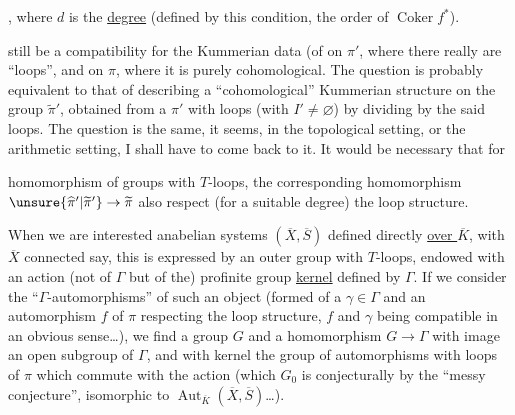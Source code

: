 

,
where $d$ is the \uline{degree} (defined  
by this condition,
   the order of $\operatorname{Coker}f^{*}$). 

 
still be a compatibility
for the Kummerian data (of
 on $\pi'$, where there really are
``loops'', and on $\pi$, where it is
purely cohomological. \unsure{\S} The question
is probably equivalent to that of describing
a ``cohomological'' Kummerian structure
on the group $\widetilde\pi'$, obtained from a $\pi'$ with
loops (with $I'\ne\varnothing$) by dividing by
the said loops. The question is the
same, it seems, in the topological setting,
or the arithmetic setting, I shall have to
come back to it. It would be necessary that for 



homomorphism  of groups with $T$-loops, the corresponding homomorphism
$\unsure{\widehat\pi'|\widetilde\pi'}\to\widetilde\pi$ also respect (for
a suitable degree) the loop structure.

When we are interested  anabelian systems
$(\overline X,\overline S)$ defined directly \uline{over $\overline K$}, with $\overline X$
connected say, this is expressed
by an outer group with $T$-loops,
endowed with an action (not of $\Gamma$ but
of the) profinite group \uline{kernel} defined by $\Gamma$.
If we consider the  ``$\Gamma$-automorphisms'' of
such an object (formed of a $\gamma\in\Gamma$ and
an  automorphism $f$ of $\pi$ respecting the
loop structure, $f$ and $\gamma$ being compatible
in an obvious sense\dots), we find
a group  $G$ and a homomorphism  $G\to\Gamma$
with image an open subgroup of $\Gamma$, and
with kernel  the group of  automorphisms with
loops of $\pi$ which commute with the action 
  (which $G_0$ is conjecturally by the
``messy conjecture'', isomorphic to  $\operatorname{Aut}_{\overline K}(\overline X,\overline S)$\dots).


